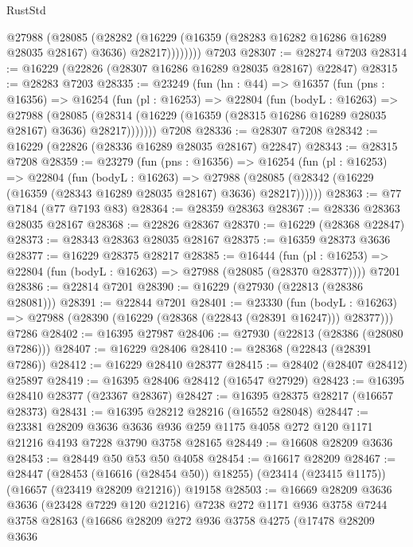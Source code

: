 \begin{lexlean}{RustStd}
\begin{coremodule}
            @27988
              (@28085
                (@28282
                  (@16229 (@16359 (@28283 @16282 @16286 @16289 @28035 @28167) @3636) @28217))))))))
    @7203
@28307 := @28274 @7203
@28314 := @16229 (@22826 (@28307 @16286 @16289 @28035 @28167) @22847)
@28315 := @28283 @7203
@28335 := @23249
    (fun (hn : @44) =>
    @16357
      (fun (pns : @16356) =>
      @16254
        (fun (pl : @16253) =>
        @22804
          (fun (bodyL : @16263) =>
          @27988
            (@28085
              (@28314 (@16229 (@16359 (@28315 @16286 @16289 @28035 @28167) @3636) @28217)))))))
    @7208
@28336 := @28307 @7208
@28342 := @16229 (@22826 (@28336 @16289 @28035 @28167) @22847)
@28343 := @28315 @7208
@28359 := @23279
    (fun (pns : @16356) =>
    @16254
      (fun (pl : @16253) =>
      @22804
        (fun (bodyL : @16263) =>
        @27988 (@28085 (@28342 (@16229 (@16359 (@28343 @16289 @28035 @28167) @3636) @28217))))))
@28363 := @77 @7184 (@77 @7193 @83)
@28364 := @28359 @28363
@28367 := @28336 @28363 @28035 @28167
@28368 := @22826 @28367
@28370 := @16229 (@28368 @22847)
@28373 := @28343 @28363 @28035 @28167
@28375 := @16359 @28373 @3636
@28377 := @16229 @28375 @28217
@28385 := @16444
    (fun (pl : @16253) => @22804 (fun (bodyL : @16263) => @27988 (@28085 (@28370 @28377))))
    @7201
@28386 := @22814 @7201
@28390 := @16229 (@27930 (@22813 (@28386 @28081)))
@28391 := @22844 @7201
@28401 := @23330
    (fun (bodyL : @16263) => @27988 (@28390 (@16229 (@28368 (@22843 (@28391 @16247))) @28377)))
    @7286
@28402 := @16395 @27987
@28406 := @27930 (@22813 (@28386 (@28080 @7286)))
@28407 := @16229 @28406
@28410 := @28368 (@22843 (@28391 @7286))
@28412 := @16229 @28410 @28377
@28415 := @28402 (@28407 @28412) @25897
@28419 := @16395 @28406 @28412 (@16547 @27929)
@28423 := @16395 @28410 @28377 (@23367 @28367)
@28427 := @16395 @28375 @28217 (@16657 @28373)
@28431 := @16395 @28212 @28216 (@16552 @28048)
@28447 := @23381
    @28209
    @3636
    @3636
    @936
    @259
    @1175
    @4058
    @272
    @120
    @1171
    @21216
    @4193
    @7228
    @3790
    @3758
    @28165
@28449 := @16608 @28209 @3636
@28453 := @28449 @50 @53 @50 @4058
@28454 := @16617 @28209
@28467 := @28447
    (@28453 (@16616 (@28454 @50)) @18255)
    (@23414 (@23415 @1175))
    (@16657 (@23419 @28209 @21216))
    @19158
@28503 := @16669
    @28209
    @3636
    @3636
    (@23428 @7229 @120 @21216)
    @7238
    @272
    @1171
    @936
    @3758
    @7244
    @3758
    @28163
    (@16686
      @28209
      @272
      @936
      @3758
      @4275
      (@17478
        @28209
        @3636

\end{coremodule}
\end{lexlean}
